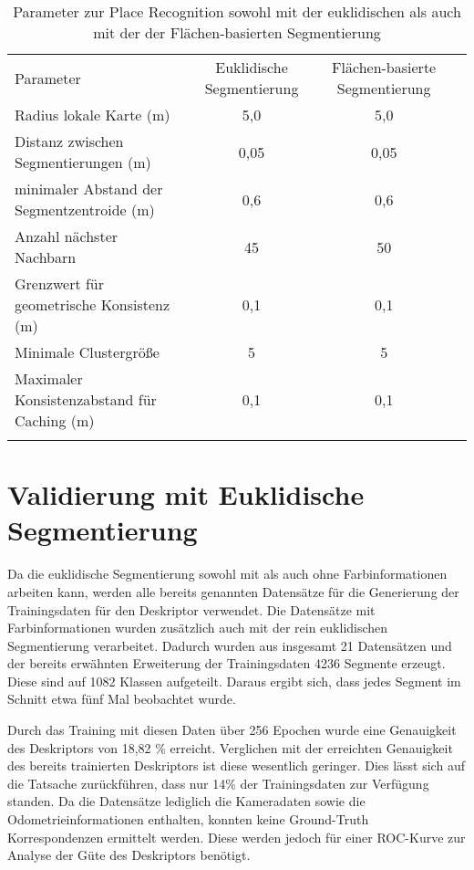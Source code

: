 \renewcommand{\arraystretch}{1}
\begin {table}[H]
 \centering
 \caption{Parameter zur Place Recognition sowohl mit der euklidischen als auch mit der der Flächen-basierten Segmentierung }
 \label{tab:Parameter_PR_smooth}
 \begin{tabulary}{\textwidth}{ L C C C }
  \hhline{===}
   Parameter    & Euklidische Segmentierung  & Flächen-basierte Segmentierung  \\
  \hhline{===}
  Radius lokale Karte (m) &  5,0 & 5,0  \\
  \hhline{---}
  Distanz zwischen Segmentierungen (m) &  0,05 & 0,05  \\
  \hhline{---}
  minimaler Abstand der Segmentzentroide (m) &  0,6 & 0,6  \\
  \hhline{---}
  Anzahl nächster Nachbarn &  45 & 50  \\
  \hhline{---}
  Grenzwert für geometrische Konsistenz (m) &  0,1 & 0,1  \\
  \hhline{---}
  Minimale Clustergröße &  5 & 5  \tabularnewline
  \hhline{---}
  Maximaler Konsistenzabstand für Caching (m) &  0,1 & 0,1 \\
  \hhline{===}
 \end{tabulary}
\end{table}

\section[Validierung mit Euklidische Segmentierung (Kopp, Schmelzer)]{Validierung mit Euklidische Segmentierung}

Da die euklidische Segmentierung sowohl mit als auch ohne Farbinformationen arbeiten kann, werden alle bereits genannten Datensätze für die Generierung der Trainingsdaten für den Deskriptor verwendet. Die Datensätze mit Farbinformationen wurden zusätzlich auch mit der rein euklidischen Segmentierung verarbeitet. Dadurch wurden aus insgesamt 21 Datensätzen und der  bereits erwähnten Erweiterung der Trainingsdaten 4236 Segmente erzeugt. Diese sind auf 1082 Klassen aufgeteilt. Daraus ergibt sich, dass jedes Segment im Schnitt etwa fünf Mal beobachtet wurde.

Durch das Training mit diesen Daten über 256 Epochen wurde eine Genauigkeit des Deskriptors von 18,82 \% erreicht. Verglichen mit der erreichten Genauigkeit des bereits trainierten Deskriptors ist diese wesentlich geringer. Dies lässt sich auf die Tatsache zurückführen, dass nur 14\% der Trainingsdaten zur Verfügung standen. Da die Datensätze lediglich die Kameradaten sowie die Odometrieinformationen enthalten, konnten keine Ground-Truth Korrespondenzen ermittelt werden. Diese werden jedoch für einer ROC-Kurve zur Analyse der Güte des Deskriptors benötigt. 

